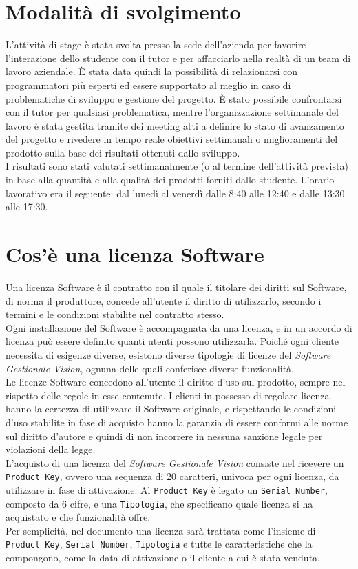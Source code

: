 \section{Modalità di svolgimento}
L’attività di stage è stata svolta presso la sede dell’azienda per favorire l’interazione dello studente con il tutor e per affacciarlo nella realtà di un team di lavoro aziendale. È stata data quindi la possibilità di relazionarsi con programmatori più esperti ed essere supportato al meglio in caso di problematiche di sviluppo e gestione del progetto.
È stato possibile confrontarsi con il tutor per qualsiasi problematica, mentre l’organizzazione settimanale del lavoro è stata gestita tramite dei meeting atti a definire lo stato di avanzamento del progetto e rivedere in tempo reale obiettivi settimanali o miglioramenti del prodotto sulla base dei risultati ottenuti dallo sviluppo.\\ I risultati sono stati valutati settimanalmente (o al termine dell’attività prevista) in base alla quantità e alla qualità dei prodotti forniti dallo studente.
L’orario lavorativo era il seguente: dal lunedì al venerdì dalle 8:40 alle 12:40 e dalle 13:30 alle 17:30.

\section{Cos'è una licenza Software}

Una licenza Software è il contratto con il quale il titolare dei diritti sul Software, di norma il produttore, concede all'utente il diritto di utilizzarlo, secondo i termini e le condizioni stabilite nel contratto stesso.
\\
Ogni installazione del Software è accompagnata da una licenza, e in un accordo di licenza può essere definito quanti utenti possono utilizzarla. Poiché ogni cliente necessita di esigenze diverse, esistono diverse tipologie di licenze del \textit{Software Gestionale Vision}, ognuna delle quali conferisce diverse funzionalità. 
\\
Le licenze Software concedono all'utente il diritto d'uso sul prodotto, sempre nel rispetto delle regole in esse contenute. I clienti in possesso di regolare licenza hanno la certezza di utilizzare il Software originale, e rispettando le condizioni d'uso stabilite in fase di acquisto hanno la garanzia di essere conformi alle norme sul diritto d'autore e quindi di non incorrere in nessuna sanzione legale per violazioni della legge.
\\
L'acquisto di una licenza del \textit{Software Gestionale Vision} consiste nel ricevere un \texttt{Product Key}, ovvero una sequenza di 20 caratteri, univoca per ogni licenza, da utilizzare in fase di attivazione. Al \texttt{Product Key} è legato un \texttt{Serial Number}, composto da 6 cifre, e una \texttt{Tipologia}, che specificano quale licenza si ha acquistato e che funzionalità offre.
\\
Per semplicità, nel documento una licenza sarà trattata come l'insieme di \texttt{Product Key}, \texttt{Serial Number}, \texttt{Tipologia} e tutte le caratteristiche che la compongono, come la data di attivazione o il cliente a cui è stata venduta.

